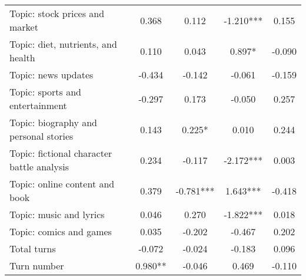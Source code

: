\begin{table}[htbp]
\begin{tabular}{p{4cm}cccc}
Topic: stock prices and market & 0.368 & 0.112 & -1.210*** & 0.155 \\
Topic: diet, nutrients, and health & 0.110 & 0.043 & 0.897* & -0.090 \\
Topic: news updates & -0.434 & -0.142 & -0.061 & -0.159 \\
Topic: sports and entertainment & -0.297 & 0.173 & -0.050 & 0.257 \\
Topic: biography and personal stories & 0.143 & 0.225* & 0.010 & 0.244 \\
Topic: fictional character battle analysis & 0.234 & -0.117 & -2.172*** & 0.003 \\
Topic: online content and book & 0.379 & -0.781*** & 1.643*** & -0.418 \\
Topic: music and lyrics & 0.046 & 0.270 & -1.822*** & 0.018 \\
Topic: comics and games & 0.035 & -0.202 & -0.467 & 0.202 \\
Total turns & -0.072 & -0.024 & -0.183 & 0.096 \\
Turn number & 0.980** & -0.046 & 0.469 & -0.110 \\
\bottomrule
\end{tabular}
\end{table}